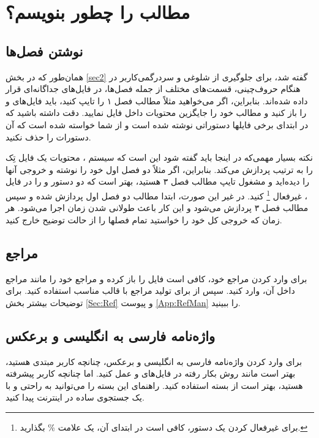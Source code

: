 \section[مطالب پروژه را چطور بنویسم؟]
{مطالب \پ را چطور بنویسم؟}
\subsection{نوشتن فصل‌ها}
همان‌طور که در بخش \ref{sec2} گفته شد، برای جلوگیری از شلوغی و سردرگمی‌کاربر در هنگام حروف‌چینی، قسمت‌های مختلف \پ از جمله فصل‌ها، در فایل‌های جداگانه‌ای قرار داده شده‌اند. 
بنابراین، اگر می‌خواهید مثلاً مطالب فصل ۱ را تایپ کنید، باید فایل‌های 
و
را باز کنید و مطالب خود را جایگزین محتویات داخل فایل 
نمایید. دقت داشته باشید که در ابتدای برخی فایلها دستوراتی نوشته شده است و از شما خواسته شده است که آن دستورات را حذف نکنید.


نکته بسیار مهمی‌که در اینجا باید گفته شود این است که سیستم \lr{\TeX}، محتویات یک فایل تِک را به ترتیب پردازش می‌کند.  بنابراین، اگر مثلاً  دو فصل اول خود را نوشته و خروجی آنها را دیده‌اید و مشغول تایپ مطالب فصل ۳ هستید، بهتر است
که دو دستور 
\verb!!
و
\verb!!
را در فایل 
،
غیرفعال%
\footnote{
برای غیرفعال کردن یک دستور، کافی است در ابتدای آن، یک علامت
\%
 بگذارید.
}
 کنید.  در غیر این صورت، ابتدا مطالب دو فصل اول  پردازش شده و سپس مطالب فصل ۳ پردازش می‌شود و این کار باعث طولانی شدن زمان اجرا می‌شود. هر زمان که خروجی کل \پ خود را خواستید تمام فصلها را از حالت توضیح خارج کنید.

\subsection{مراجع}
برای وارد کردن مراجع \پ خود، کافی است فایل 
را باز کرده و مراجع خود را مانند مراجع داخل آن، وارد کنید.  سپس از  برای تولید مراجع با قالب مناسب استفاده کنید. برای توضیحات بیشتر بخش \ref{Sec:Ref} و پیوست \ref{App:RefMan} را ببینید.


\subsection{واژه‌نامه فارسی به انگلیسی و برعکس}
برای وارد کردن واژه‌نامه فارسی به انگلیسی و برعکس، چنانچه کاربر مبتدی هستید، بهتر است مانند روش بکار رفته در فایل‌های 
و
عمل کنید. اما چنانچه کاربر پیشرفته هستید، بهتر است از بسته
استفاده کنید. راهنمای این بسته را می‌توانید به راحتی و با یک جستجوی ساده در اینترنت پیدا کنید.
